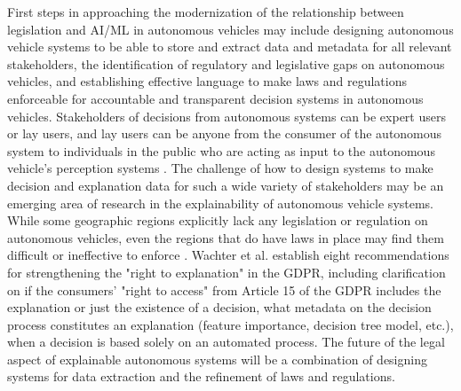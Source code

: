 First steps in approaching the modernization of the relationship between legislation and AI/ML in autonomous vehicles may include designing autonomous vehicle systems to be able to store and extract data and metadata for all relevant stakeholders, the identification of regulatory and legislative gaps on autonomous vehicles, and establishing effective language to make laws and regulations enforceable for accountable and transparent decision systems in autonomous vehicles.  Stakeholders of decisions from autonomous systems can be expert users or lay users, and lay users can be anyone from the consumer of the autonomous system to individuals in the public who are acting as input to the autonomous vehicle's perception systems \cite{Ras2018ExplanationMI}.  The challenge of how to design systems to make decision and explanation data for such a wide variety of stakeholders may be an emerging area of research in the explainability of autonomous vehicle systems.  While some geographic regions explicitly lack any legislation or regulation on autonomous vehicles, even the regions that do have laws in place may find them difficult or ineffective to enforce \cite{Mittelstadt2017}.  Wachter et al. establish eight recommendations for strengthening the "right to explanation" in the GDPR, including clarification on if the consumers' "right to access" from Article 15 of the GDPR includes the explanation or just the existence of a decision, what metadata on the decision process constitutes an explanation (feature importance, decision tree model, etc.), when a decision is based solely on an automated process.  The future of the legal aspect of explainable autonomous systems will be a combination of designing systems for data extraction and the refinement of laws and regulations.

